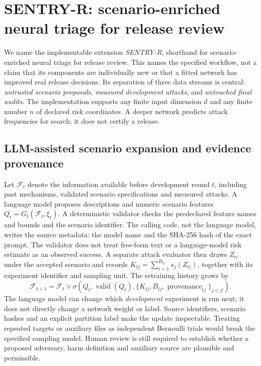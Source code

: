 \section{SENTRY-R: scenario-enriched neural triage for release review}\label{sec:sentry}

We name the implementable extension \emph{SENTRY-R}, shorthand for
scenario-enriched neural triage for release review. This names the specified
workflow, not a claim that its
components are individually new or that a fitted network has improved real
release decisions. Its separation of three data streams is central:
\emph{untrusted scenario proposals}, \emph{measured development attacks}, and
\emph{untouched final audits}. The implementation supports any finite input
dimension $d$ and any finite number $n$ of declared risk coordinates. A deeper
network predicts attack frequencies for search; it does not certify a release.

\subsection{LLM-assisted scenario expansion and evidence provenance}

Let $\mathcal F_t$ denote the information available before development round
$t$, including past mechanisms, validated scenario specifications and measured
attacks. A language model proposes descriptions and numeric scenario features
$Q_t=G_t(\mathcal F_t,\xi_t)$. A deterministic validator checks the predeclared
feature names and bounds and the scenario identifier. The calling code, not
the language model, writes the source metadata: the model name and the
SHA-256 hash of the exact prompt. The validator does
not treat free-form text or a language-model risk estimate as an observed
success. A separate attack evaluator then draws $Z_{ti}$ under the accepted
scenario and records $K_{tj}=\sum_{i=1}^{B_{tj}}s_j(Z_{ti})$, together with
its experiment identifier and sampling unit. The retraining history grows by
\begin{equation}
 \mathcal F_{t+1}=\mathcal F_t\vee\sigma\!\left(Q_t,\operatorname{valid}(Q_t),
 \{K_{tj},B_{tj},\operatorname{provenance}_{tj}\}_{j\in\mathcal J}\right).
 \label{eq:sentry-filtration}
\end{equation}
The language model can change which \emph{development} experiment is run next;
it does not directly change a network weight or label. Source identifiers,
scenario hashes and an explicit partition label make the update inspectable.
Treating repeated targets or auxiliary files as independent Bernoulli trials
would break the specified sampling model. Human review is still required to
establish whether a proposed adversary, harm definition and auxiliary source
are plausible and permissible.

